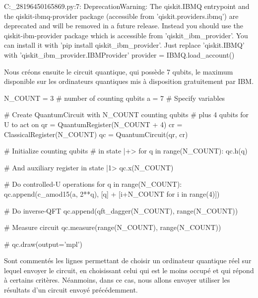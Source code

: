 \begin{pyprint}
C:\Users\romai\AppData\Local\Temp\ipykernel_28196\2450165869.py:7: DeprecationWarning: The qiskit.IBMQ entrypoint and the qiskit-ibmq-provider package (accessible from 'qiskit.providers.ibmq') are deprecated and will be removed in a future release. Instead you should use the qiskit-ibm-provider package which is accessible from 'qiskit_ibm_provider'. You can install it with 'pip install qiskit_ibm_provider'. Just replace 'qiskit.IBMQ' with 'qiskit_ibm_provider.IBMProvider'
  provider = IBMQ.load_account()
\end{pyprint}

Nous créons ensuite le circuit quantique, qui possède 7 qubits, le maximum disponible sur les ordinateurs
quantiques mis à disposition gratuitement par IBM\@.\\

\begin{pyin}
N_COUNT = 3  # number of counting qubits
a = 7
# Specify variables

# Create QuantumCircuit with N_COUNT counting qubits
# plus 4 qubits for U to act on
qr = QuantumRegister(N_COUNT + 4)
cr = ClassicalRegister(N_COUNT)
qc = QuantumCircuit(qr, cr)

# Initialize counting qubits
# in state |+>
for q in range(N_COUNT):
    qc.h(q)

# And auxiliary register in state |1>
qc.x(N_COUNT)

# Do controlled-U operations
for q in range(N_COUNT):
    qc.append(c_amod15(a, 2**q),
              [q] + [i+N_COUNT for i in range(4)])

# Do inverse-QFT
qc.append(qft_dagger(N_COUNT), range(N_COUNT))

# Measure circuit
qc.measure(range(N_COUNT), range(N_COUNT))

# qc.draw(output='mpl')
\end{pyin}

Sont commentés les lignes permettant de choisir un ordinateur quantique réel sur lequel envoyer le circuit,
en choisissant celui qui est le moins occupé et qui répond à certains critères.
Néanmoins, dans ce cas, nous allons envoyer utiliser les résultats d'un circuit envoyé précédemment.\\

